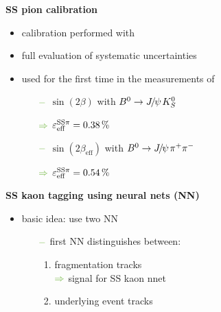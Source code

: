 {\begin{minipage}{0.474\boxwidth}
\textbf{SS pion calibration}
\vspace{-0.3em}
\begin{itemize}
\setlength\itemsep{0.01em}
\item calibration performed with \BdToJPsiKst
\item full evaluation of systematic uncertainties 
\item used for the first time in the measurements of
\begin{itemize}
\setlength{\itemindent}{-.11in}
\item[${\color{tu_gruen}-}$] $\sin(2\beta)$ with $\Bd \rightarrow \jpsi K_S^0$
\setlength{\itemindent}{.05in}
\item[${\color{tu_gruen}\Rightarrow}$] $\varepsilon_{\text{eff}}^{\text{SS}\pi} = 0.38\,\%$
\setlength{\itemindent}{-.11in}
\item[${\color{tu_gruen}-}$] $\sin(2\beta_{\text{eff}})$ with $\Bd \rightarrow \jpsi \pi^+ \pi^-$
\setlength{\itemindent}{.05in}
\item[${\color{tu_gruen}\Rightarrow}$] $\varepsilon_{\text{eff}}^{\text{SS}\pi} = 0.54\,\%$
\end{itemize}

\end{itemize}
\vspace{-0.7em}
\end{minipage}
\hfill
\begin{minipage}{0.474\boxwidth}
\vspace{0.25em}
\textbf{SS kaon tagging using neural nets (NN)}
\vspace{-0.42em}

\begin{itemize}
\item basic idea: use two NN
\vspace{-0.5em}
	\begin{itemize}
	\setlength\itemsep{0.01em}
	\setlength{\itemindent}{-.11in}
	\item[${\color{tu_gruen}-}$] first NN distinguishes between:
	\vspace{-0.25em}
		\begin{enumerate}
		\item fragmentation tracks\\
		${\color{tu_gruen}\Rightarrow}$ signal for SS kaon nnet
		\item underlying event tracks 
		\end{enumerate}
	\end{itemize}
\vspace{-1.7em}


\end{itemize}
\end{minipage}}
